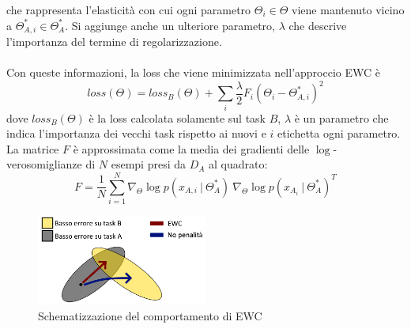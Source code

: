 che rappresenta l'elasticità con cui ogni parametro $\Theta_i \in \Theta$ viene mantenuto vicino a $\Theta_{A,i}^*\in\Theta_A^*$. Si aggiunge anche un ulteriore parametro, $\lambda$ che descrive l'importanza del termine di regolarizzazione.\\\\
Con queste informazioni, la loss che viene minimizzata nell'approccio EWC è
\begin{equation}\label{eq:ewc_loss}
    loss(\Theta) = loss_B(\Theta) + \sum_i \frac{\lambda}{2} F_i\left(\Theta_i - \Theta_{A,i}^*\right)^2
\end{equation}
dove $loss_B(\Theta)$ è la loss calcolata solamente sul task $B$, $\lambda$ è un parametro che indica l'importanza dei vecchi task rispetto ai nuovi e $i$ etichetta ogni parametro. La matrice $F$ è approssimata come la media dei gradienti delle $\log$-verosomiglianze di $N$ esempi presi da $D_A$ al quadrato:
\begin{equation}\label{eq:ewc_F}
    F = \frac{1}{N}\sum_{i=1}^N \nabla_\Theta \log p(x_{A,i}\:|\:\Theta_A^*)\:\nabla_\Theta \log p(x_{A_i}\:|\:\Theta_A^*)^T
\end{equation}
\begin{figure}[h]
	\begin{center}
		\includegraphics[width=0.5\textwidth]{img/ewc.png}
		\caption{Schematizzazione del comportamento di EWC}
		\label{fig:ewc}
	\end{center}
\end{figure}

